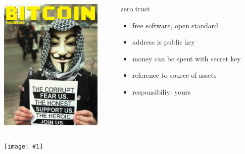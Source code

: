 \documentclass[12pt,english]{beamer}
\newcommand {\framedgraphic}[1] {
    \begin{frame}
        \begin{center}
            \texttt{[image: \#1]}
        \end{center}
    \end{frame}
}
\begin{document}
\begin{frame}
	\frametitle{}
  \begin{columns}[T]
    \begin{column}{.4\textwidth}
		\includegraphics[width=5cm]{./img/btc_presentation/bm.png}
    \end{column}
    \begin{column}{.5\textwidth}
	\begin{block}{zero trust}
	\begin{itemize}
		\item free software, open standard
		\item address is public key
		\item money can be spent with secret key
		\item reference to source of assets
		\item responsibiliy: yours
	\end{itemize}
	\end{block}
    \end{column}
  \end{columns}
\end{frame}

\framedgraphic{./img/btc_presentation/blockchain.png}
\end{document}
